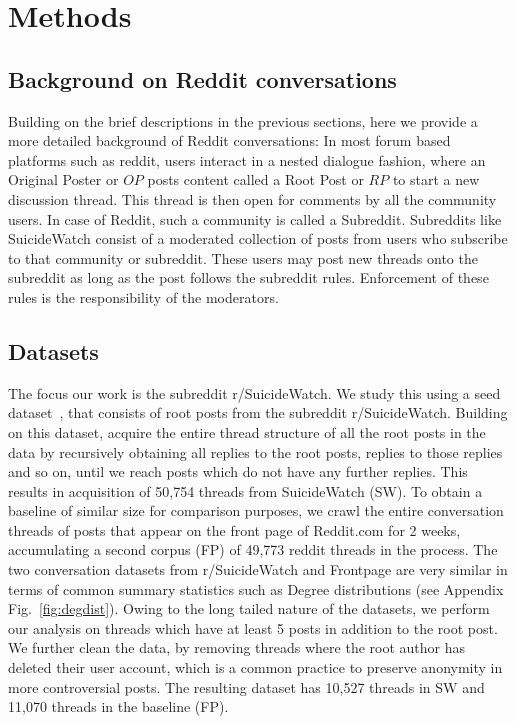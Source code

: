 \section{Methods}
\label{section:methods}
\subsection{Background on Reddit conversations}
Building on the brief descriptions in the previous sections, here we provide a more detailed background of Reddit conversations: In most forum based platforms such as reddit,  users interact in a nested dialogue fashion, where an Original Poster or $OP$ posts content called a Root Post or $RP$ to start  a new discussion thread. This thread is then open for comments by all the community users. In case of Reddit, such a community is called a Subreddit. Subreddits like SuicideWatch consist of a moderated collection of posts from users who subscribe to that community or subreddit. These users may post new threads onto the subreddit as long as the post follows the subreddit rules. Enforcement of these rules is the responsibility of the moderators. %

\subsection{Datasets} \label{sec:data}
The focus our work is the subreddit r/SuicideWatch. We study this using a seed dataset~\cite{gkotsis2017characterisation}, that consists of root posts from the subreddit r/SuicideWatch. Building on this dataset, acquire the entire thread structure of all the root posts in the data by recursively obtaining all replies to the root posts, replies to those replies and so on, until we reach posts which do not have any further replies. This results in acquisition of 50,754 threads from SuicideWatch (SW). To obtain a baseline of similar size for comparison purposes, we crawl the entire conversation threads of posts that appear on the front page of Reddit.com  for 2 weeks,  accumulating a second corpus (FP) of 49,773 reddit threads in the process. 
%
The two conversation datasets from r/SuicideWatch and Frontpage are very similar in terms of common summary statistics such as Degree distributions (see Appendix Fig.~\ref{fig:degdist}). 
Owing to the long tailed nature of the datasets, we perform our analysis on threads  which have at least 5 posts in addition to the root post.
We further clean the data, by removing threads where the root author has deleted their user account, which is a common practice to preserve anonymity in more controversial posts. The resulting dataset has 10,527 threads in SW and 11,070 threads in the baseline (FP). 

